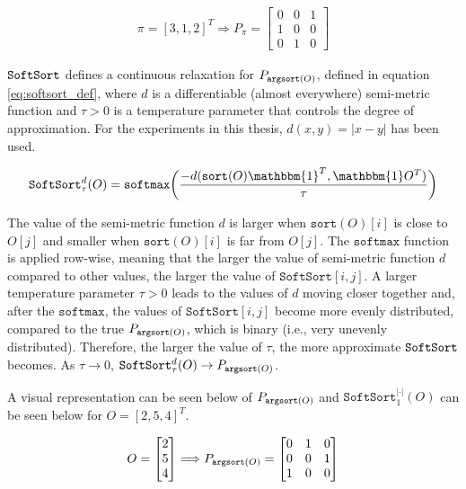 \begin{align} \label{eq:permutation_matrix_example}
	\pi = [3, 1, 2]^T \Longrightarrow	P_{\pi} = 
	\left[\begin{array}{lllll}
		0 & 0 & 1 \\
		1 & 0 & 0 \\
		0 & 1 & 0
	\end{array}\right]
\end{align}

$\operatorname*{\texttt{SoftSort}}$ defines a continuous relaxation for $P_{\operatorname*{\texttt{argsort}}(O)}$, defined in equation \ref{eq:softsort_def}, where $d$ is a differentiable (almost everywhere) semi-metric function and $\tau >0$ is a temperature parameter that controls the degree of approximation. For the experiments in this thesis, $d(x,y) = |x-y|$ has been used.

\begin{equation} \label{eq:softsort_def}
	\texttt{SoftSort}^d_{\tau}(O) = \texttt{softmax}\bigg( \frac{-d(\texttt{sort}(O)\mathbbm{1}^T, \mathbbm{1}O^T)}{\tau} \bigg)
\end{equation}

The value of the semi-metric function $d$ is larger when $\texttt{sort}(O)[i]$ is close to $O[j]$ and smaller when $\texttt{sort}(O)[i]$ is far from $O[j]$. The $\texttt{softmax}$ function is applied row-wise, meaning that the larger the value of semi-metric function $d$ compared to other values, the larger the value of $\texttt{SoftSort}[i,j]$. A larger temperature parameter $\tau>0$ leads to the values of $d$ moving closer together and, after the $\texttt{softmax}$, the values of $\texttt{SoftSort}[i,j]$ become more evenly distributed, compared to the true $P_{\operatorname*{\texttt{argsort}}(O)}$, which is binary (i.e., very unevenly distributed). Therefore, the larger the value of $\tau$, the more approximate $\operatorname*{\texttt{SoftSort}}$ becomes. As $\tau \to 0$, $\operatorname*{\texttt{SoftSort}}^d_{\tau}(O) \to P_{\operatorname*{\texttt{argsort}}(O)}$.

A visual representation can be seen below of $P_{\operatorname*{\texttt{argsort}}(O)}$ and $\texttt{SoftSort}^{|\cdot|}_{1}(O)$ can be seen below for $O = [2,5,4]^T$.

\begin{equation}
	O = \begin{bmatrix}
		2 \\
		5 \\
		4
	\end{bmatrix}
	\Longrightarrow
	P_{\operatorname*{\texttt{argsort}}(O)} =
	\begin{bmatrix}
		0 & 1 & 0 \\
		0 & 0 & 1 \\
		1 & 0 & 0 \\
	\end{bmatrix}
\end{equation}

